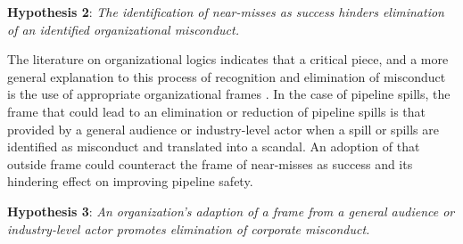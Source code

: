 \textbf{Hypothesis 2}: \textit{The identification of near-misses as success hinders elimination of an identified organizational misconduct.}

The literature on organizational logics indicates that a critical piece, and a more general explanation to this process of recognition and elimination of misconduct is the use of appropriate organizational frames \citep{Misangyi2008}. In the case of pipeline spills, the frame that could lead to an elimination or reduction of pipeline spills is that provided by a general audience or industry-level actor when a spill or spills are identified as misconduct and translated into a scandal. An adoption of that outside frame could counteract the frame of near-misses as success and its hindering effect on improving pipeline safety.

\textbf{Hypothesis 3}: \textit{An organization's adaption of a frame from a general audience or industry-level actor promotes elimination of corporate misconduct.}